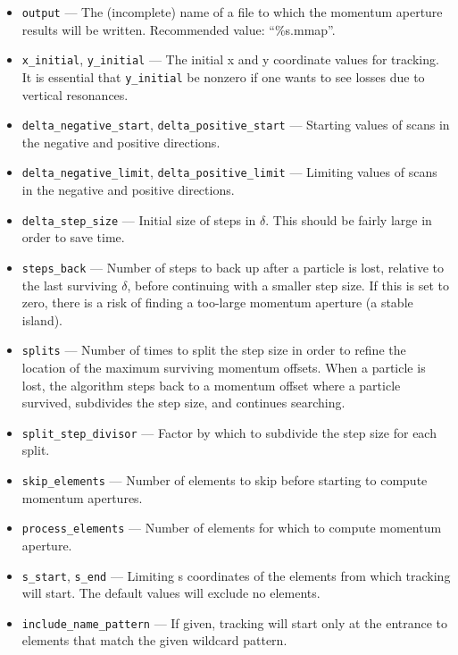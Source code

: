 \documentclass[11pt]{article}
\begin{document}
\begin{itemize}
\item \verb|output| --- The (incomplete) name of a file to which the momentum aperture results will be written.
  Recommended value: ``\%s.mmap''.
\item \verb|x_initial|, \verb|y_initial| --- The initial x and y coordinate values for tracking. It is essential
 that \verb|y_initial| be nonzero if one wants to see losses due to vertical resonances.  
\item \verb|delta_negative_start|, \verb|delta_positive_start| ---
Starting values of scans in the negative and positive
directions. 
\item \verb|delta_negative_limit|, \verb|delta_positive_limit| ---
Limiting values of scans in the negative and positive
directions. 
\item \verb|delta_step_size| --- Initial size of steps in $\delta$.  This should
 be fairly large in order to save time.

\item \verb|steps_back| --- Number of steps to back up after a particle is lost,
 relative to the last surviving $\delta$, before continuing with a smaller step size.
 If this is set to zero, there is a risk of finding a too-large momentum aperture
 (a stable island).

\item \verb|splits| --- Number of times to split the step size in
 order to refine the location of the maximum surviving momentum
 offsets.  When a particle is lost, the algorithm steps back to a momentum offset
 where a particle survived, subdivides the step size, and continues searching.  

\item \verb|split_step_divisor| --- Factor by which to subdivide the step size
  for each split.

\item \verb|skip_elements| --- Number of elements to skip before starting to
  compute momentum apertures.

\item \verb|process_elements| --- Number of elements for which to compute
  momentum aperture.

\item \verb|s_start|, \verb|s_end| --- Limiting s coordinates of the
 elements from which tracking will start.  The default values will
 exclude no elements.

\item \verb|include_name_pattern| --- If given, tracking will start
only at the entrance to elements that match the given wildcard
pattern.


\end{itemize}
\end{document}
